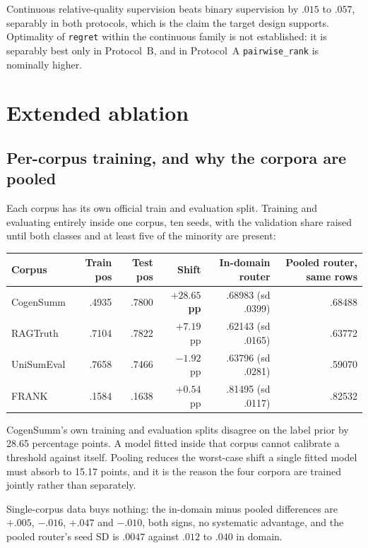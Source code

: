 \documentclass[10pt,a4paper]{article}
\newcommand{\fix}[1]{\textcolor{red!65!black}{#1}}
\begin{document}
Continuous relative-quality supervision beats binary supervision by $.015$ to $.057$, separably in
both protocols, which is the claim the target design supports. \fix{Optimality of \texttt{regret}
within the continuous family is not established:} it is separably best only in Protocol~B, and in
Protocol~A \texttt{pairwise\_rank} is nominally higher.

\section{Extended ablation}

\subsection{Per-corpus training, and why the corpora are pooled}

Each corpus has its own official train and evaluation split. Training and evaluating entirely
inside one corpus, ten seeds, with the validation share raised until both classes and at least
five of the minority are present:

\begin{center}\small
\begin{tabular}{lrrrrr}
\toprule
Corpus & Train pos & Test pos & \textbf{Shift} & In-domain router & Pooled router, same rows \\
\midrule
CogenSumm & .4935 & .7800 & \textbf{$+28.65$ pp} & .68983 (sd .0399) & .68488 \\
RAGTruth & .7104 & .7822 & $+7.19$ pp & .62143 (sd .0165) & .63772 \\
UniSumEval & .7658 & .7466 & $-1.92$ pp & .63796 (sd .0281) & .59070 \\
FRANK & .1584 & .1638 & $+0.54$ pp & .81495 (sd .0117) & .82532 \\
\bottomrule
\end{tabular}
\end{center}

CogenSumm's own training and evaluation splits disagree on the label prior by 28.65 percentage
points. A model fitted inside that corpus cannot calibrate a threshold against itself. Pooling
reduces the worst-case shift a single fitted model must absorb to 15.17 points, and it is the
reason the four corpora are trained jointly rather than separately.

Single-corpus data buys nothing: the in-domain minus pooled differences are $+.005$, $-.016$,
$+.047$ and $-.010$, both signs, no systematic advantage, and the pooled router's seed SD is
$.0047$ against $.012$ to $.040$ in domain.
\end{document}
